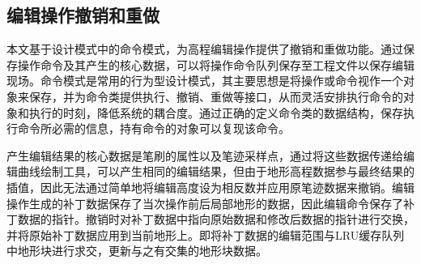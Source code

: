 \subsection{编辑操作撤销和重做}
本文基于设计模式中的命令模式，为高程编辑操作提供了撤销和重做功能。通过保存操作命令及其产生的核心数据，可以将操作命令队列保存至工程文件以保存编辑现场。命令模式是常用的行为型设计模式，其主要思想是将操作或命令视作一个对象来保存，并为命令类提供执行、撤销、重做等接口，从而灵活安排执行命令的对象和执行的时刻，降低系统的耦合度。通过正确的定义命令类的数据结构，保存执行命令所必需的信息，持有命令的对象可以复现该命令。\par
产生编辑结果的核心数据是笔刷的属性以及笔迹采样点，通过将这些数据传递给编辑曲线绘制工具，可以产生相同的编辑结果，但由于地形高程数据参与最终结果的插值，因此无法通过简单地将编辑高度设为相反数并应用原笔迹数据来撤销。编辑操作生成的补丁数据保存了当次操作前后局部地形的数据，因此编辑命令保存了补丁数据的指针。撤销时对补丁数据中指向原始数据和修改后数据的指针进行交换，并将原始补丁数据应用到当前地形上。即将补丁数据的编辑范围与LRU缓存队列中地形块进行求交，更新与之有交集的地形块数据。\par
